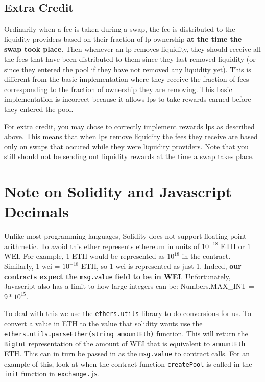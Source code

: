 \documentclass[11pt]{article}
\begin{document}
\subsection{Extra Credit}
Ordinarily when a fee is taken during a swap, the fee is distributed to the liquidity providers based on their fraction of lp ownership \textbf{at the time the swap took place}. Then whenever an lp removes liquidity, they should receive all the fees that have been distributed to them since they last removed liquidity (or since they entered the pool if they have not removed any liquidity yet). This is different from the basic implementation where they receive the fraction of fees corresponding to the fraction of ownership they are removing. This basic implementation is incorrect because it allows lps to take rewards earned before they entered the pool.

For extra credit, you may chose to correctly implement rewards lps as described above. This means that when lps remove liquidity the fees they receive are based only on swaps that occured while they were liquidity providers. Note that you still should not be sending out liquidity rewards at the time a swap takes place.

\section{Note on Solidity and Javascript Decimals}
Unlike most programming languages, Solidity does not support floating point arithmetic. To avoid this ether represents ethereum in units of $10^{-18}$ ETH or $1$ WEI. For example, 1 ETH would be represented as $10^{18}$ in the contract. Similarly, 1 wei = $10^{-18}$ ETH, so 1 wei is represented as just 1. Indeed, \textbf{our contracts expect the} \texttt{msg.value} \textbf{field to be in WEI}. Unfortunately, Javascript also has a limit to how large integers can be: Numbers.MAX\_INT = $9 * 10^{15}$. 

To deal with this we use the \texttt{ethers.utils} library to do conversions for us. To convert a value in ETH to the value that solidity wants use the \texttt{ethers.utils.parseEther(string amountEth)} function. This will return the \texttt{BigInt} representation of the amount of WEI that is equivalent to \texttt{amountEth} ETH. This can in turn be passed in as the \texttt{msg.value} to contract calls. For an example of this, look at when the contract function \texttt{createPool} is called in the \texttt{init} function in \texttt{exchange.js}.
\end{document}
